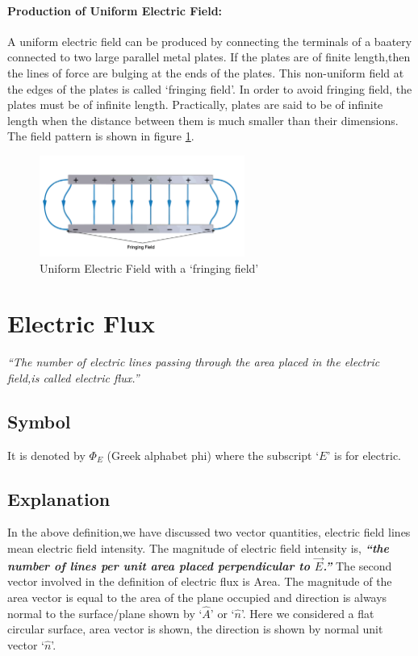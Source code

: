 \paragraph{Production of Uniform Electric Field:}
A uniform electric field can be produced by connecting the
terminals of a baatery connected to two large parallel metal plates.
If the plates are of finite length,then the lines of force are bulging
at the ends of the plates. This non-uniform field at the edges
of the plates is called `fringing field’. In order to avoid fringing field,
the plates must be of infinite length. Practically, plates are said to
be of infinite length when the distance between them is much smaller than
their dimensions. The field pattern is shown in figure \ref{fig:11.8}.

\begin{figure}[H]
  \centering
  \includegraphics[width=0.6\textwidth]{Images/Chapter-11/11.8.png}
  \caption{Uniform Electric Field with a `fringing field'}
  \label{fig:11.8}
\end{figure}

\section{Electric Flux}
\textit{“The number of electric lines passing through the area placed in the electric field,is called electric flux.”}
\subsection*{Symbol}
It is denoted by $\Phi_{E}$ (Greek alphabet phi) where the subscript `$E$’
is for electric.
\subsection*{Explanation}
In the above definition,we have discussed two vector quantities,
electric field lines mean electric field intensity. The magnitude of
electric field intensity is, \textit{\textbf{“the number of lines per unit area
placed perpendicular to $\vec{E}$.”}} The second vector involved in the
definition of electric flux is Area. The magnitude of the area vector
is equal to the area of the plane occupied and direction is always normal
to the surface/plane shown by `$\hat{A}$' or `$\hat{n}$'.
Here we considered a flat circular surface, area vector is shown,
the direction is shown by normal unit vector `$\hat{n}$'.

